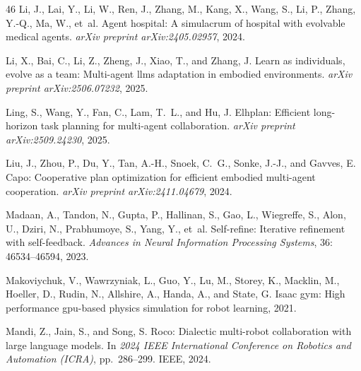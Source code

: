\documentclass{article}
\theoremstyle{plain}
\theoremstyle{definition}
\theoremstyle{remark}
\begin{document}
\begin{thebibliography}{46}
Li, J., Lai, Y., Li, W., Ren, J., Zhang, M., Kang, X., Wang, S., Li, P., Zhang,
  Y.-Q., Ma, W., et~al.
\newblock Agent hospital: A simulacrum of hospital with evolvable medical
  agents.
\newblock \emph{arXiv preprint arXiv:2405.02957}, 2024{}.

Li, X., Bai, C., Li, Z., Zheng, J., Xiao, T., and Zhang, J.
\newblock Learn as individuals, evolve as a team: Multi-agent llms adaptation
  in embodied environments.
\newblock \emph{arXiv preprint arXiv:2506.07232}, 2025.

Ling, S., Wang, Y., Fan, C., Lam, T.~L., and Hu, J.
\newblock Elhplan: Efficient long-horizon task planning for multi-agent
  collaboration.
\newblock \emph{arXiv preprint arXiv:2509.24230}, 2025.

Liu, J., Zhou, P., Du, Y., Tan, A.-H., Snoek, C.~G., Sonke, J.-J., and Gavves,
  E.
\newblock Capo: Cooperative plan optimization for efficient embodied
  multi-agent cooperation.
\newblock \emph{arXiv preprint arXiv:2411.04679}, 2024.

Madaan, A., Tandon, N., Gupta, P., Hallinan, S., Gao, L., Wiegreffe, S., Alon,
  U., Dziri, N., Prabhumoye, S., Yang, Y., et~al.
\newblock Self-refine: Iterative refinement with self-feedback.
\newblock \emph{Advances in Neural Information Processing Systems},
  36: 46534--46594, 2023.

Makoviychuk, V., Wawrzyniak, L., Guo, Y., Lu, M., Storey, K., Macklin, M.,
  Hoeller, D., Rudin, N., Allshire, A., Handa, A., and State, G.
\newblock Isaac gym: High performance gpu-based physics simulation for robot
  learning, 2021.

Mandi, Z., Jain, S., and Song, S.
\newblock Roco: Dialectic multi-robot collaboration with large language models.
\newblock In \emph{2024 IEEE International Conference on Robotics and
  Automation (ICRA)}, pp.\  286--299. IEEE, 2024.


\end{thebibliography}
\end{document}
